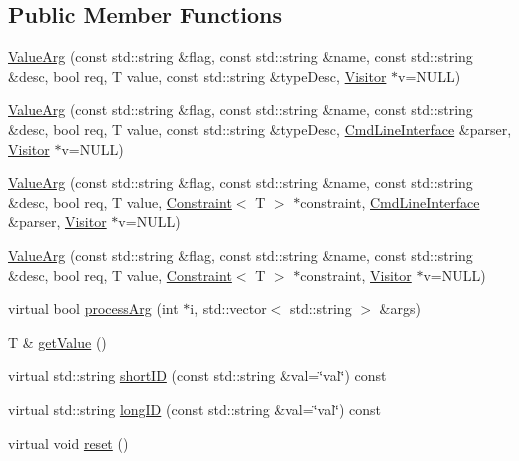 \subsection*{Public Member Functions}
\begin{DoxyCompactItemize}
\item 
\hyperlink{class_t_c_l_a_p_1_1_value_arg_ab2818435a1749bee3233b1f364dabf09}{Value\+Arg} (const std\+::string \&flag, const std\+::string \&name, const std\+::string \&desc, bool req, T value, const std\+::string \&type\+Desc, \hyperlink{class_t_c_l_a_p_1_1_visitor}{Visitor} $\ast$v=N\+U\+L\+L)
\item 
\hyperlink{class_t_c_l_a_p_1_1_value_arg_a3b34856ee6613ccabe60d2c5a6cc714f}{Value\+Arg} (const std\+::string \&flag, const std\+::string \&name, const std\+::string \&desc, bool req, T value, const std\+::string \&type\+Desc, \hyperlink{class_t_c_l_a_p_1_1_cmd_line_interface}{Cmd\+Line\+Interface} \&parser, \hyperlink{class_t_c_l_a_p_1_1_visitor}{Visitor} $\ast$v=N\+U\+L\+L)
\item 
\hyperlink{class_t_c_l_a_p_1_1_value_arg_aa054e7649b5d9db4861eed344a8f5840}{Value\+Arg} (const std\+::string \&flag, const std\+::string \&name, const std\+::string \&desc, bool req, T value, \hyperlink{class_t_c_l_a_p_1_1_constraint}{Constraint}$<$ T $>$ $\ast$constraint, \hyperlink{class_t_c_l_a_p_1_1_cmd_line_interface}{Cmd\+Line\+Interface} \&parser, \hyperlink{class_t_c_l_a_p_1_1_visitor}{Visitor} $\ast$v=N\+U\+L\+L)
\item 
\hyperlink{class_t_c_l_a_p_1_1_value_arg_a152c816b8bdb19efada14e8aec9bd05c}{Value\+Arg} (const std\+::string \&flag, const std\+::string \&name, const std\+::string \&desc, bool req, T value, \hyperlink{class_t_c_l_a_p_1_1_constraint}{Constraint}$<$ T $>$ $\ast$constraint, \hyperlink{class_t_c_l_a_p_1_1_visitor}{Visitor} $\ast$v=N\+U\+L\+L)
\item 
virtual bool \hyperlink{class_t_c_l_a_p_1_1_value_arg_a71e6ee7c7324724b6fc067c5ffe31160}{process\+Arg} (int $\ast$i, std\+::vector$<$ std\+::string $>$ \&args)
\item 
T \& \hyperlink{class_t_c_l_a_p_1_1_value_arg_a46900b79f4549a37003120be284adfee}{get\+Value} ()
\item 
virtual std\+::string \hyperlink{class_t_c_l_a_p_1_1_value_arg_abb1eb22814d0a0da49c5f8bb57362d09}{short\+I\+D} (const std\+::string \&val=\char`\"{}val\char`\"{}) const 
\item 
virtual std\+::string \hyperlink{class_t_c_l_a_p_1_1_value_arg_a586d25c04c39ddf0e589605d79f72f8a}{long\+I\+D} (const std\+::string \&val=\char`\"{}val\char`\"{}) const 
\item 
virtual void \hyperlink{class_t_c_l_a_p_1_1_value_arg_a1bc480b71c4d8ac3646e796af8fb6e14}{reset} ()
\end{DoxyCompactItemize}
